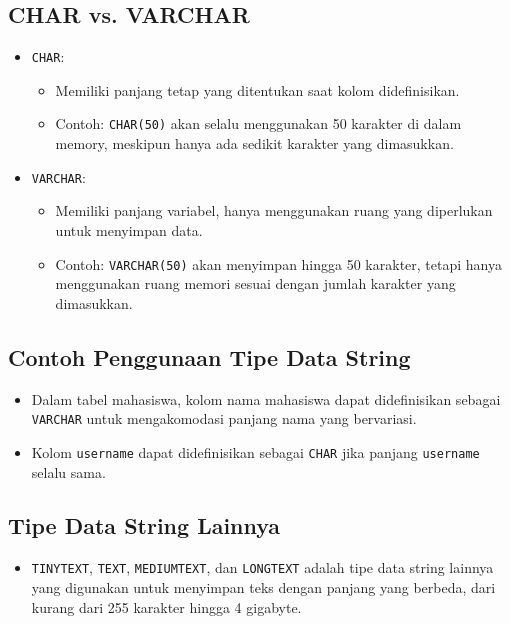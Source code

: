 \documentclass{article}
\begin{document}
\subsection{CHAR vs. VARCHAR}
\begin{itemize}
    \item \texttt{CHAR}:
          \begin{itemize}
              \item Memiliki panjang tetap yang ditentukan saat kolom didefinisikan.
              \item Contoh: \texttt{CHAR(50)} akan selalu menggunakan 50 karakter di dalam memory, meskipun hanya ada sedikit karakter yang dimasukkan.
          \end{itemize}
    \item \texttt{VARCHAR}:
          \begin{itemize}
              \item Memiliki panjang variabel, hanya menggunakan ruang yang diperlukan untuk menyimpan data.
              \item Contoh: \texttt{VARCHAR(50)} akan menyimpan hingga 50 karakter, tetapi hanya menggunakan ruang memori sesuai dengan jumlah karakter yang dimasukkan.
          \end{itemize}
\end{itemize}

\subsection{Contoh Penggunaan Tipe Data String}
\begin{itemize}
    \item Dalam tabel mahasiswa, kolom nama mahasiswa dapat didefinisikan sebagai \texttt{VARCHAR} untuk mengakomodasi panjang nama yang bervariasi.
    \item Kolom \texttt{username} dapat didefinisikan sebagai \texttt{CHAR} jika panjang \texttt{username} selalu sama.
\end{itemize}

\subsection{Tipe Data String Lainnya}
\begin{itemize}
    \item \texttt{TINYTEXT}, \texttt{TEXT}, \texttt{MEDIUMTEXT}, dan \texttt{LONGTEXT} adalah tipe data string lainnya yang digunakan untuk menyimpan teks dengan panjang yang berbeda, dari kurang dari 255 karakter hingga 4 gigabyte.
\end{itemize}
\end{document}
